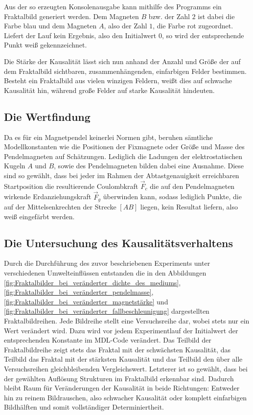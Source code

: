 Aus der so erzeugten Konsolenausgabe kann mithilfe des Programms \cite{extendedPlotter} ein Fraktalbild generiert werden. Dem Magneten $B$ bzw. der Zahl $2$ ist dabei die Farbe blau und dem Magneten $A$, also der Zahl $1$, die Farbe rot zugeordnet. Liefert der Lauf kein Ergebnis, also den Initialwert $0$, so wird der entsprechende Punkt weiß gekennzeichnet.

Die Stärke der Kausalität lässt sich nun anhand der Anzahl und Größe der auf dem Fraktalbild sichtbaren, zusammenhängenden, einfarbigen Felder bestimmen. Besteht ein Fraktalbild aus vielen winzigen Feldern, weißt dies auf schwache Kausalität hin, während große Felder auf starke Kausalität hindeuten.

\subsection{Die Wertfindung}
\label{ssec:die_wertfindung}

Da es für ein Magnetpendel keinerlei Normen gibt, beruhen sämtliche Modellkonstanten wie die Positionen der Fixmagnete oder Größe und Masse des Pendelmagneten auf Schätzungen. Lediglich die Ladungen der elektrostatischen Kugeln $A$ und $B$, sowie des Pendelmagneten bilden dabei eine Ausnahme. Diese sind so gewählt, dass bei jeder im Rahmen der Abtastgenauigkeit erreichbaren Startposition die resultierende Coulombkraft $\vec{F}_{c}$ die auf den Pendelmagneten wirkende Erdanziehungskraft $\vec{F}_{g}$ überwinden kann, sodass lediglich Punkte, die auf der Mittelsenkrechten der Strecke $[AB]$ liegen, kein Resultat liefern, also weiß eingefärbt werden.

\subsection{Die Untersuchung des Kausalitätsverhaltens}
\label{ssec:die_untersuchung_des_kausalitätsverhaltens}

Durch die Durchführung des zuvor beschriebenen Experiments unter verschiedenen Umwelteinflüssen entstanden die in den Abbildungen \ref{fig:Fraktalbilder_bei_veränderter_dichte_des_mediums}, \ref{fig:Fraktalbilder_bei_veränderter_pendelmasse}, \ref{fig:Fraktalbilder_bei_veränderter_magnetstärke} und \ref{fig:Fraktalbilder_bei_veränderter_fallbeschleunigung} dargestellten Fraktalbildreihen. Jede Bildreihe stellt eine Versuchsreihe dar, wobei stets nur ein Wert verändert wird. Dazu wird vor jedem Experimentlauf der Initialwert der entsprechenden Konstante im MDL-Code verändert. Das Teilbild \pa der Fraktalbildreihe zeigt stets das Fraktal mit der schwächsten Kausalität, das Teilbild \pc das Fraktal mit der stärksten Kausalität und das Teilbild \pb den über alle Versuchsreihen gleichbleibenden Vergleichswert. Letzterer ist so gewählt, dass bei der gewählten Auflösung Strukturen im Fraktalbild erkennbar sind. Dadurch bleibt Raum für Veränderungen der Kausalität in beide Richtungen: Entweder hin zu reinem Bildrauschen, also schwacher Kausalität oder komplett einfarbigen Bildhälften und somit vollständiger Determiniertheit.

